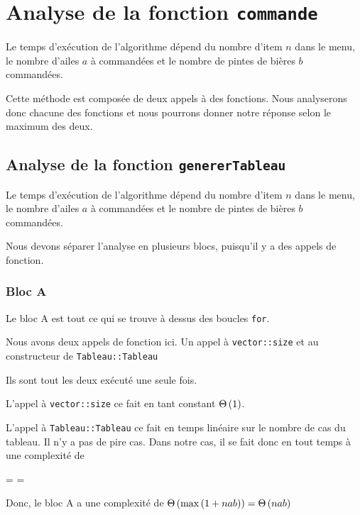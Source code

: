 \documentclass[class=article]{standalone}
\begin{document}
\section*{Analyse de la fonction \lstinline{commande}}

Le temps d'exécution de l'algorithme dépend du nombre d'item $n$ dans le menu,
le nombre d'ailes $a$ à commandées et le nombre de pintes de bières $b$ commandées.

Cette méthode est composée de deux appels à des fonctions. Nous analyserons donc
chacune des fonctions et nous pourrons donner notre réponse selon le maximum des deux.

\subsection*{Analyse de la fonction \lstinline{genererTableau} }

Le temps d'exécution de l'algorithme dépend du nombre d'item $n$ dans le menu,
le nombre d'ailes $a$ à commandées et le nombre de pintes de bières $b$ commandées.

Nous devons séparer l'analyse en plusieurs blocs, puisqu'il y a des appels de fonction.

\subsubsection*{Bloc A}

Le bloc A est tout ce qui se trouve à dessus des boucles \lstinline{for}.

Nous avons deux appels de fonction ici. Un appel à \lstinline{vector::size} et au constructeur
de \lstinline{Tableau::Tableau}

Ils sont tout les deux exécuté une seule fois.

L'appel à \lstinline{vector::size} ce fait en tant constant $\Theta\left ( 1 \right )$.

L'appel à \lstinline{Tableau::Tableau} ce fait en temps linéaire sur le nombre de cas du tableau.
Il n'y a pas de pire cas.
Dans notre cas, il se fait donc en tout temps à une complexité de
\begin{deriv}
\Theta{}
\<= 
\Theta{} 
\<= 
\Theta{} 
\end{deriv}

Donc, le bloc A a une complexité de $\Theta\left ( \max\left ( 1 + nab \right ) \right ) = \Theta\left ( nab \right )$
\end{document}
